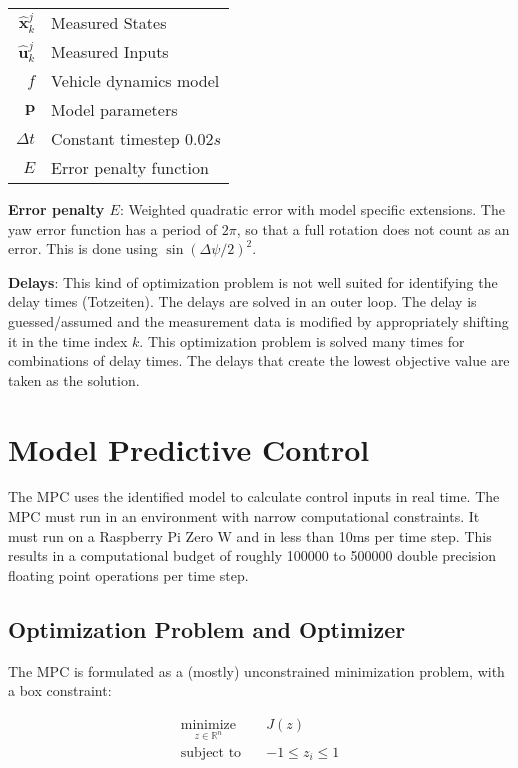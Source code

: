 \documentclass[12pt]{article}
\begin{document}
\begin{center}
\begin{tabular}{ r | l }
 $\hat{\boldsymbol{x}}_k^j$ & Measured States  \\ 
 $\hat{\boldsymbol{u}}_k^j$ & Measured Inputs   \\ 
 $f$ & Vehicle dynamics model  \\ 
 $\boldsymbol{p}$ & Model parameters  \\ 
 $\Delta t$ & Constant timestep $0.02s$ \\ 
 $E$ & Error penalty function \\ 
\end{tabular}
\end{center}

\textbf{Error penalty $E$}: Weighted quadratic error with model specific extensions. The yaw error function has a period of $2\pi$, so that a full rotation does not count as an error. This is done using $\sin(\Delta\psi/2)^2$.


\textbf{Delays}: This kind of optimization problem is not well suited for identifying the delay times (Totzeiten). The delays are solved in an outer loop. The delay is guessed/assumed and the measurement data is modified by appropriately shifting it in the time index $k$. This optimization problem is solved many times for combinations of delay times. The delays that create the lowest objective value are taken as the solution.


\section{Model Predictive Control}

The MPC uses the identified model to calculate control inputs in real time. The MPC must run in an environment with narrow computational constraints. It must run on a Raspberry Pi Zero W and in less than 10ms per time step. This results in a computational budget of roughly 100000 to 500000 double precision floating point operations per time step.


\subsection{Optimization Problem and Optimizer}

The MPC is formulated as a (mostly) unconstrained minimization problem, with a box constraint:

\begin{align}
\underset{z \in \mathbb{R}^n}{\text{minimize}} \quad & J(z) \\
\text{subject to} \quad & -1 \leq z_i  \leq 1 
\end{align}
\end{document}
